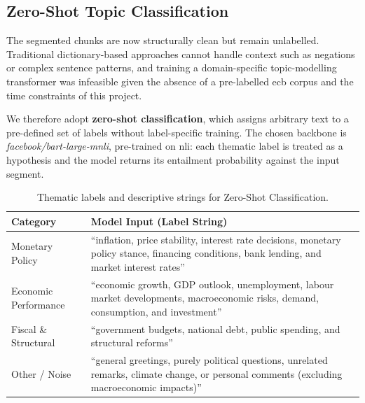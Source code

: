 \FloatBarrier

\subsection{Zero-Shot Topic Classification}
\label{sec:topic_classification}

The segmented chunks are now structurally clean but remain unlabelled. Traditional dictionary-based approaches cannot handle context such as negations or complex sentence patterns, and training a domain-specific topic-modelling transformer was infeasible given the absence of a pre-labelled \gls{ecb} corpus and the time constraints of this project.

We therefore adopt \textbf{zero-shot classification}, which assigns arbitrary text to a pre-defined set of labels without label-specific training. The chosen backbone is \emph{facebook/bart-large-mnli}, pre-trained on \gls{nli}: each thematic label is treated as a hypothesis and the model returns its entailment probability against the input segment.

\begin{table}[ht]
    \centering
    \caption[Thematic labels and descriptive strings]{Thematic labels and descriptive strings for Zero-Shot Classification.}
    \label{tab:labels}
    \begin{tabular}{@{}lp{8cm}@{}}
        \toprule
        \textbf{Category}    & \textbf{Model Input (Label String)}                                                                                                            \\ \midrule
        Monetary Policy      & ``inflation, price stability, interest rate decisions, monetary policy stance, financing conditions, bank lending, and market interest rates'' \\ \addlinespace
        Economic Performance & ``economic growth, GDP outlook, unemployment, labour market developments, macroeconomic risks, demand, consumption, and investment''           \\ \addlinespace
        Fiscal \& Structural & ``government budgets, national debt, public spending, and structural reforms''                                                                 \\ \addlinespace
        Other / Noise        & ``general greetings, purely political questions, unrelated remarks, climate change, or personal comments (excluding macroeconomic impacts)''   \\ \bottomrule
    \end{tabular}
\end{table}

